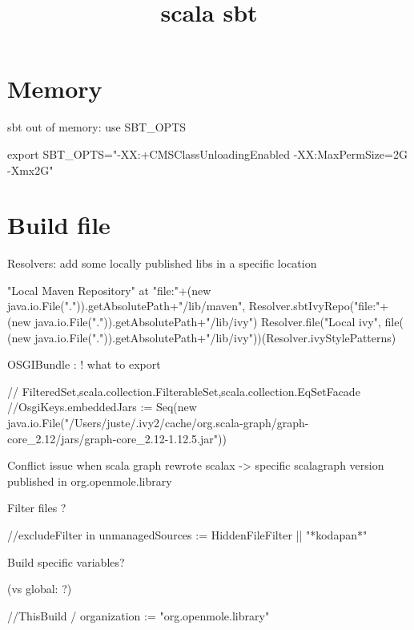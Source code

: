 


\title{scala sbt}


\date{}


\maketitle

\justify

\renewcommand{\abstractname}{}

\begin{abstract}

\end{abstract}


\section*{Memory}

sbt out of memory: use SBT_OPTS

export SBT_OPTS="-XX:+CMSClassUnloadingEnabled -XX:MaxPermSize=2G -Xmx2G"




\section*{Build file}


Resolvers: add some locally published libs in a specific location

"Local Maven Repository" at "file:"+(new java.io.File(".")).getAbsolutePath+"/lib/maven",
 Resolver.sbtIvyRepo("file:"+(new java.io.File(".")).getAbsolutePath+"/lib/ivy")
 Resolver.file("Local ivy", file( (new java.io.File(".")).getAbsolutePath+"/lib/ivy"))(Resolver.ivyStylePatterns)


OSGIBundle : ! what to export

  // FilteredSet,scala.collection.FilterableSet,scala.collection.EqSetFacade
  //OsgiKeys.embeddedJars := Seq(new java.io.File("/Users/juste/.ivy2/cache/org.scala-graph/graph-core_2.12/jars/graph-core_2.12-1.12.5.jar"))

Conflict issue when scala graph rewrote scalax -> specific scalagraph version published in org.openmole.library



Filter files ?

//excludeFilter in unmanagedSources := HiddenFileFilter || "*kodapan*"


Build specific variables? 

(vs global: ?)

//ThisBuild / organization := "org.openmole.library"




%
%



